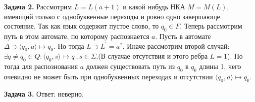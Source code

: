 \documentclass[12pt]{article}
\begin{document}
  \maketitle
    \textbf{Задача 2.}
      Рассмотрим $L = L(a + 1)$ и какой нибудь НКА $M =  M(L)$, имеющий только с однобуквенные переходы и ровно одно завершающе состояние. Так как язык содержит пустое слово, то $q_0 \in F$. Теперь рассмотрим путь в этом автомате, по которому распознается $a$. Пусть в автомате  $\Delta \supset \langle q_0, a \rangle \mapsto q_0 $. Но тогда $L \supset L^{'} = a^{*}$. Иначе рассмотрим второй случай: $ \exists q \neq q_0 \in Q : \langle q_0, s \rangle \mapsto q \ , s \in \Sigma$.(В слуачае отсутствия и этого ребра $L = 1$). Но тогда для распознования $a$ должен существовать путь из $q_0$ в $q_0$ длины 1, чего очевидно не может быть при однобуквенных переходах и отсутствии $\langle q_0, a \rangle \mapsto q_0 $. 

    \textbf{Задача 3.}
      Ответ: неверно.
\end{document}
